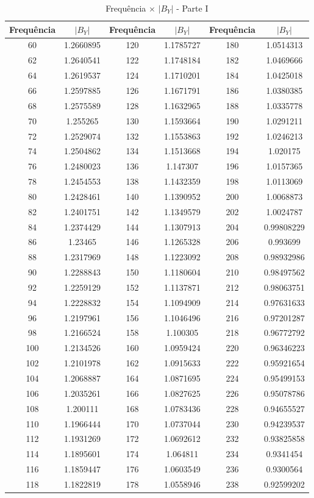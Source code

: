 \documentclass[
	12pt,				%
	openright,			%
	twoside,			%
	a4paper,			%
	english,			%
	french,				%
	spanish,			%
	brazil,				%
	]{abntex2}
\begin{document}
\begin{apendicesenv}
\newpage
\begin{table}[H]
\caption{Frequência  $\times$ $|B_{Y}|$ - Parte I}
\centering
\begin{tabular}{c c| c c | c c}
Frequência & $|B_{Y}|$ & Frequência & $|B_{Y}|$ & Frequência & $|B_{Y}|$ \\
\hline 
60 & 1.2660895 & 120 & 1.1785727 & 180 & 1.0514313\\
62 & 1.2640541 & 122 & 1.1748184 & 182 & 1.0469666\\
64 & 1.2619537 & 124 & 1.1710201 & 184 & 1.0425018\\
66 & 1.2597885 & 126 & 1.1671791 & 186 & 1.0380385\\
68 & 1.2575589 & 128 & 1.1632965 & 188 & 1.0335778\\
70 & 1.255265 & 130 & 1.1593664 & 190 & 1.0291211\\
72 & 1.2529074 & 132 & 1.1553863 & 192 & 1.0246213\\
74 & 1.2504862 & 134 & 1.1513668 & 194 & 1.020175\\
76 & 1.2480023 & 136 & 1.147307 & 196 & 1.0157365\\
78 & 1.2454553 & 138 & 1.1432359 & 198 & 1.0113069\\
80 & 1.2428461 & 140 & 1.1390952 & 200 & 1.0068873\\
82 & 1.2401751 & 142 & 1.1349579 & 202 & 1.0024787\\
84 & 1.2374429 & 144 & 1.1307913 & 204 & 0.99808229\\
86 & 1.23465 & 146 & 1.1265328 & 206 & 0.993699\\
88 & 1.2317969 & 148 & 1.1223092 & 208 & 0.98932986\\
90 & 1.2288843 & 150 & 1.1180604 & 210 & 0.98497562\\
92 & 1.2259129 & 152 & 1.1137871 & 212 & 0.98063751\\
94 & 1.2228832 & 154 & 1.1094909 & 214 & 0.97631633\\
96 & 1.2197961 & 156 & 1.1046496 & 216 & 0.97201287\\
98 & 1.2166524 & 158 & 1.100305 & 218 & 0.96772792\\
100 & 1.2134526 & 160 & 1.0959424 & 220 & 0.96346223\\
102 & 1.2101978 & 162 & 1.0915633 & 222 & 0.95921654\\
104 & 1.2068887 & 164 & 1.0871695 & 224 & 0.95499153\\
106 & 1.2035261 & 166 & 1.0827625 & 226 & 0.95078786\\
108 & 1.200111 & 168 & 1.0783436 & 228 & 0.94655527\\
110 & 1.1966444 & 170 & 1.0737044 & 230 & 0.94239537\\
112 & 1.1931269 & 172 & 1.0692612 & 232 & 0.93825858\\
114 & 1.1895601 & 174 & 1.064811 & 234 & 0.9341454\\
116 & 1.1859447 & 176 & 1.0603549 & 236 & 0.9300564\\
118 & 1.1822819 & 178 & 1.0558946 & 238 & 0.92599202


\end{tabular}
\end{table}
\end{apendicesenv}
\end{document}
